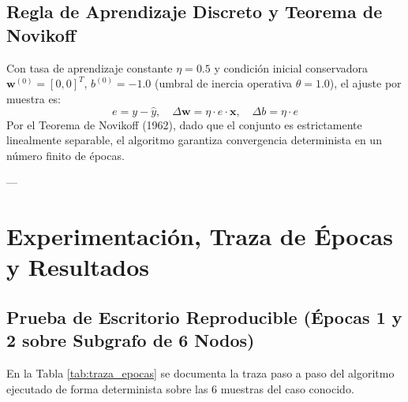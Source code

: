 \documentclass[11pt,letterpaper]{article}
\begin{document}
\subsection{Regla de Aprendizaje Discreto y Teorema de Novikoff}

Con tasa de aprendizaje constante $\eta = 0.5$ y condición inicial conservadora $\mathbf{w}^{(0)} = [0, 0]^T$, $b^{(0)} = -1.0$ (umbral de inercia operativa $\theta = 1.0$), el ajuste por muestra es:
\begin{equation}
e = y - \hat{y}, \quad \Delta \mathbf{w} = \eta \cdot e \cdot \mathbf{x}, \quad \Delta b = \eta \cdot e
\end{equation}
Por el Teorema de Novikoff (1962), dado que el conjunto es estrictamente linealmente separable, el algoritmo garantiza convergencia determinista en un número finito de épocas.

---

\section{Experimentación, Traza de Épocas y Resultados}

\subsection{Prueba de Escritorio Reproducible (Épocas 1 y 2 sobre Subgrafo de 6 Nodos)}

En la Tabla \ref{tab:traza_epocas} se documenta la traza paso a paso del algoritmo ejecutado de forma determinista sobre las 6 muestras del caso conocido.
\end{document}
